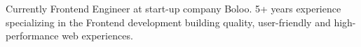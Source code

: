 \begin{cvparagraph}

Currently Frontend Engineer at start-up company Boloo. 5+ years experience specializing in the Frontend development building quality, user-friendly and high-performance web experiences.

\end{cvparagraph}
